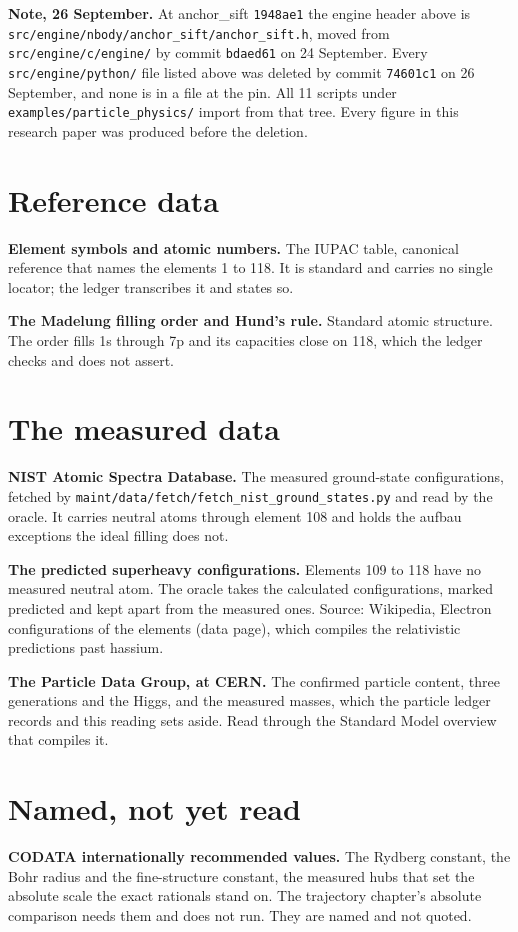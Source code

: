 \textbf{Note, 26 September.} At anchor\_sift \texttt{1948ae1} the engine header above is
\texttt{src/\allowbreak{}engine/\allowbreak{}nbody/\allowbreak{}anchor\_sift/\allowbreak{}anchor\_sift.h},
moved from \texttt{src/\allowbreak{}engine/\allowbreak{}c/\allowbreak{}engine/} by commit
\texttt{bdaed61} on 24 September. Every \texttt{src/\allowbreak{}engine/\allowbreak{}python/} file
listed above was deleted by commit \texttt{74601c1} on 26 September, and none is in a file at the pin.
All 11 scripts under \texttt{examples/\allowbreak{}particle\_physics/} import from that tree. Every
figure in this research paper was produced before the deletion.

\section*{Reference data}

\textbf{Element symbols and atomic numbers.} The IUPAC table, canonical reference that names the
elements 1 to 118. It is standard and carries no single locator; the ledger transcribes it and states
so.

\textbf{The Madelung filling order and Hund's rule.} Standard atomic structure. The order fills 1s
through 7p and its capacities close on 118, which the ledger checks and does not assert.

\section*{The measured data}

\textbf{NIST Atomic Spectra Database.} The measured ground-state configurations, fetched by
\texttt{maint/\allowbreak{}data/\allowbreak{}fetch/\allowbreak{}fetch\_nist\_ground\_states.py} and read
by the oracle. It carries neutral atoms through element 108 and holds the aufbau exceptions the ideal
filling does not.

\textbf{The predicted superheavy configurations.} Elements 109 to 118 have no measured neutral atom.
The oracle takes the calculated configurations, marked predicted and kept apart from the measured
ones.
Source: Wikipedia, Electron configurations of the elements (data page), which compiles the relativistic
predictions past hassium.

\textbf{The Particle Data Group, at CERN.} The confirmed particle content, three generations and the
Higgs, and the measured masses, which the particle ledger records and this reading sets aside. Read
through the Standard Model overview that compiles it.

\section*{Named, not yet read}

\textbf{CODATA internationally recommended values.} The Rydberg constant, the Bohr radius and the
fine-structure constant, the measured hubs that set the absolute scale the exact rationals stand on.
The trajectory chapter's absolute comparison needs them and does not run. They are named and not
quoted.
